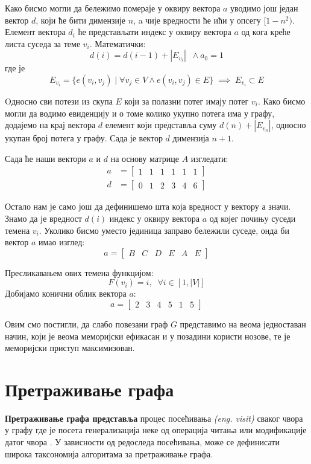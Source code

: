 \par Како бисмо могли да бележимо помераје у оквиру вектора $a$ уводимо још један вектор $d$, који ће бити димензије $n$, a чије вредности ће ићи у опсегу $[1-n^2)$. Елемент вектора $d_{i}$ ће представљати индекс у оквиру вектора $a$ од кога креће листа суседа за теме $v_i$. Математички:
$$d(i) = d(i - 1) + |E_{v_i}| \;\; \land a_0=1$$
где је
$$E_{v_i} = \{e(v_i, v_j) \; | \; \forall v_j \in V \land e(v_i, v_j) \in E\} \; \implies \; E_{v_i}\subset E$$

Oдносно сви потези из скупа $E$ који за полазни потег имају потег $v_i$. Како бисмо могли да водимо евиденцију и о томе колико укупно потега има у графу, додајемо на крај вектора $d$ елемент који представља суму $d(n) + |E_{v_n}|$, односно укупан број потега у графу. Сада је вектор $d$ димензија $n + 1$.

\par
Сада ће наши вектори $a$ и $d$ на основу матрице $A$ изгледати:
\[
\begin{split}
a &= 
\begin{bmatrix}
    1 & 1 & 1 & 1 & 1 & 1
\end{bmatrix}\\
d &=
\begin{bmatrix}
    0 & 1 & 2 & 3 & 4 & 6
\end{bmatrix}
\end{split}
\]
\par
Остало нам је само још да дефинишемо шта која вредност у вектору $а$ значи. Знамо да је вредност $d(i)$ индекс у оквиру вектора $a$ од којег почињу суседи темена $v_i$. Уколико бисмо уместо јединица заправо бележили суседе, онда би вектор $a$ имао изглед:
$$
a = 
\begin{bmatrix}
    B & C & D & E & A & E
\end{bmatrix}
$$
\par
Пресликавањем ових темена функцијом:
$$
F(v_i) = i, \; \; \forall i \in [1, \lvert V \rvert]
$$
Добијамо конични облик вектора $a$:
$$
a = 
\begin{bmatrix}
    2 & 3 & 4 & 5 & 1 & 5
\end{bmatrix}
$$
\par
Овим смо постигли, да слабо повезани граф $G$ представимо на веома једноставан начин, који је веома меморијски ефикасан и у позадини користи нозове, те је меморијски приступ максимизован.

\section{Претраживање графа}
\textbf{Претраживање графа представља} процес посећивања \textit{(eng. visit)} сваког чвора у графу где је посета генерализација неке од операција читања или модификације датог чвора \cite{graph-algorithms}. У зависности од редоследа посећивања, може се дефинисати широка таксономија алгоритама за претраживање графа.

